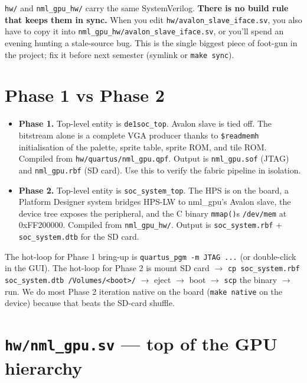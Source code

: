 \documentclass[11pt,letterpaper]{article}
\begin{document}
\texttt{hw/} and \texttt{nml\_gpu\_hw/} carry the same SystemVerilog.
\textbf{There is no build rule that keeps them in sync.} When you edit
\texttt{hw/avalon\_slave\_iface.sv}, you also have to copy it into
\texttt{nml\_gpu\_hw/avalon\_slave\_iface.sv}, or you'll spend an evening
hunting a stale-source bug. This is the single biggest piece of foot-gun in
the project; fix it before next semester (symlink or \texttt{make sync}).

\section{Phase 1 vs Phase 2}

\begin{itemize}[leftmargin=*]
  \item \textbf{Phase 1.} Top-level entity is \texttt{de1soc\_top}. Avalon
    slave is tied off. The bitstream alone is a complete VGA producer thanks
    to \texttt{\$readmemh} initialisation of the palette, sprite table,
    sprite ROM, and tile ROM. Compiled from \texttt{hw/quartus/nml\_gpu.qpf}.
    Output is \texttt{nml\_gpu.sof} (JTAG) and \texttt{nml\_gpu.rbf}
    (SD card). Use this to verify the fabric pipeline in isolation.
  \item \textbf{Phase 2.} Top-level entity is \texttt{soc\_system\_top}. The
    HPS is on the board, a Platform Designer system bridges HPS-LW to
    nml\_gpu's Avalon slave, the device tree exposes the peripheral, and
    the C binary \texttt{mmap()}s \texttt{/dev/mem} at 0xFF200000. Compiled
    from \texttt{nml\_gpu\_hw/}. Output is \texttt{soc\_system.rbf} +
    \texttt{soc\_system.dtb} for the SD card.
\end{itemize}

The hot-loop for Phase 1 bring-up is \texttt{quartus\_pgm -m JTAG ...} (or
double-click in the GUI). The hot-loop for Phase 2 is mount SD card $\to$
\texttt{cp soc\_system.rbf soc\_system.dtb /Volumes/<boot>/} $\to$ eject
$\to$ boot $\to$ \texttt{scp} the binary $\to$ run. We do most Phase 2
iteration native on the board (\texttt{make native} on the device) because
that beats the SD-card shuffle.

\section{\texttt{hw/nml\_gpu.sv} --- top of the GPU hierarchy}
\end{document}
